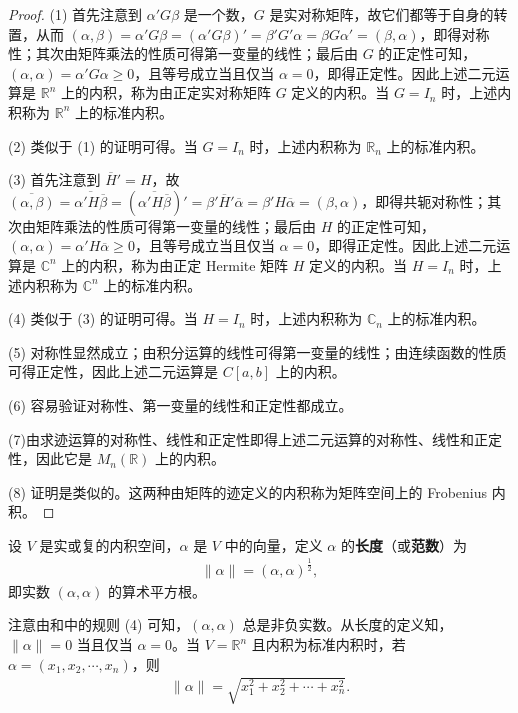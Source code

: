 \documentclass[../../main.tex]{subfiles}
\begin{document}
\begin{proof}
(1) 首先注意到 $\alpha'G\beta$ 是一个数，$G$ 是实对称矩阵，故它们都等于自身的转置，从而 $(\alpha, \beta) = \alpha'G\beta = (\alpha'G\beta)' = \beta'G'\alpha = \beta G\alpha' = (\beta, \alpha)$，即得对称性；其次由矩阵乘法的性质可得第一变量的线性；最后由 $G$ 的正定性可知，$(\alpha, \alpha) = \alpha'G\alpha \geq 0$，且等号成立当且仅当 $\alpha = 0$，即得正定性。因此上述二元运算是 $\mathbb{R}^n$ 上的内积，称为由正定实对称矩阵 $G$ 定义的内积。当 $G = I_n$ 时，上述内积称为 $\mathbb{R}^n$ 上的标准内积。

(2) 类似于 (1) 的证明可得。当 $G = I_n$ 时，上述内积称为 $\mathbb{R}_n$ 上的标准内积。

(3) 首先注意到 $\overline{H}' = H$，故 $\overline{(\alpha, \beta)} = \overline{\alpha' H\overline{\beta}} = (\overline{\alpha' H\overline{\beta}})' = \beta'\overline{H}'\overline{\alpha} = \beta' H\overline{\alpha} = (\beta, \alpha)$，即得共轭对称性；其次由矩阵乘法的性质可得第一变量的线性；最后由 $H$ 的正定性可知，$(\alpha, \alpha) = \alpha' H\overline{\alpha} \geq 0$，且等号成立当且仅当 $\alpha = 0$，即得正定性。因此上述二元运算是 $\mathbb{C}^n$ 上的内积，称为由正定 Hermite 矩阵 $H$ 定义的内积。当 $H = I_n$ 时，上述内积称为 $\mathbb{C}^n$ 上的标准内积。

(4) 类似于 (3) 的证明可得。当 $H = I_n$ 时，上述内积称为 $\mathbb{C}_n$ 上的标准内积。

(5) 对称性显然成立；由积分运算的线性可得第一变量的线性；由连续函数的性质可得正定性，因此上述二元运算是 $C[a, b]$ 上的内积。

(6) 容易验证对称性、第一变量的线性和正定性都成立。

(7)由求迹运算的对称性、线性和正定性即得上述二元运算的对称性、线性和正定性，因此它是 $M_n(\mathbb{R})$ 上的内积。

(8) 证明是类似的。这两种由矩阵的迹定义的内积称为矩阵空间上的 Frobenius 内积。
\end{proof}

\begin{definition}[范数]\label{definition:向量的长度或范数}
设 \(V\) 是实或复的内积空间，\(\alpha\) 是 \(V\) 中的向量，定义 \(\alpha\) 的\textbf{长度}（或\textbf{范数}）为
\begin{align*}
\|\alpha\|=(\alpha,\alpha)^{\frac{1}{2}},
\end{align*}
即实数 \((\alpha,\alpha)\) 的算术平方根。
\end{definition}
\begin{remark}
注意由和中的规则 (4) 可知，\((\alpha,\alpha)\) 总是非负实数。从长度的定义知，\(\|\alpha\| = 0\) 当且仅当 \(\alpha = 0\)。当 \(V=\mathbb{R}^n\) 且内积为标准内积时，若 \(\alpha=(x_1,x_2,\cdots,x_n)\)，则
\begin{align*}
\|\alpha\|=\sqrt{x_1^2 + x_2^2+\cdots + x_n^2}.
\end{align*}
\end{remark}
\end{document}
